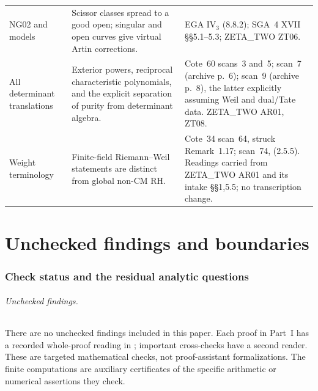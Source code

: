 \begin{longtable}{p{}p{}p{}}
NG02 and models &
Scissor classes spread to a good open; singular and open curves
give virtual Artin corrections. &
EGA IV$_3$ (8.8.2); SGA~4 XVII \S\S5.1--5.3;
ZETA\_TWO ZT06.\\[3pt]
All determinant translations &
Exterior powers, reciprocal characteristic polynomials, and the
explicit separation of purity from determinant algebra. &
Cote~60 scans~3 and~5; scan~7 (archive p.~6);
scan~9 (archive p.~8), the latter explicitly assuming Weil
and dual/Tate data. ZETA\_TWO AR01, ZT08.\\[3pt]
Weight terminology &
Finite-field Riemann--Weil statements are distinct from global
non-CM RH. &
Cote~34 scan~64, struck Remark~1.17;
scan~74, (2.5.5). Readings carried from ZETA\_TWO AR01
and its intake \S\S1,5.5; no transcription change.\\
\bottomrule
\end{longtable}
\normalsize

\part{Unchecked findings and boundaries}
\section{Check status and the residual analytic questions}

\paragraph{Unchecked findings.}
There are no unchecked findings included in this paper.
Each proof in Part~I has a recorded whole-proof reading in
; important cross-checks have a second reader.
These are targeted mathematical checks, not proof-assistant
formalizations.  The finite computations are auxiliary certificates
of the specific arithmetic or numerical assertions they check.


